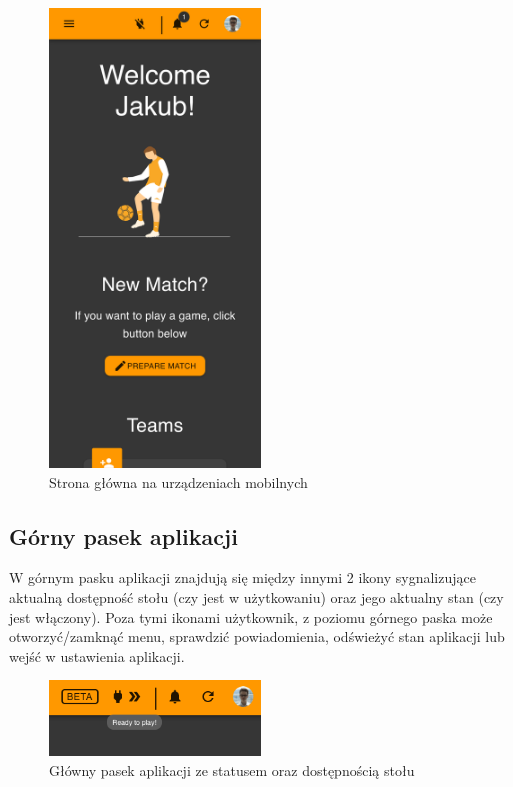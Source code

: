 \begin{figure}[h!]
  \centering
    \includegraphics[width=0.5\textwidth]{images/player/mobile_view.png}
  \caption{Strona główna na urządzeniach mobilnych}
  \label{fig:mobile}
\end{figure}

\subsection{Górny pasek aplikacji}

W górnym pasku aplikacji znajdują się między innymi 2 ikony sygnalizujące aktualną dostępność stołu (czy jest w użytkowaniu) oraz jego aktualny stan (czy jest włączony). Poza tymi ikonami użytkownik, z poziomu górnego paska może otworzyć/zamknąć menu, sprawdzić powiadomienia, odświeżyć stan aplikacji lub wejść w ustawienia aplikacji.

\begin{figure}[h!]
  \centering
    \includegraphics[width=0.5\textwidth]{images/player/appbar.png}
  \caption{Główny pasek aplikacji ze statusem oraz dostępnością stołu}
  \label{fig:mobile}
\end{figure}

